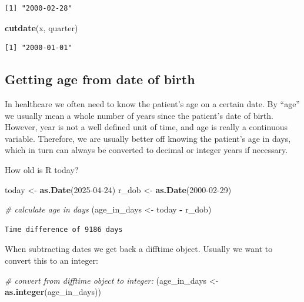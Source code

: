 \documentclass[
]{book}
\newenvironment{Shaded}{\begin{snugshade}}{\end{snugshade}}
\newcommand{\CommentTok}[1]{\textcolor[rgb]{0.56,0.35,0.01}{\textit{#1}}}
\newcommand{\FunctionTok}[1]{\textcolor[rgb]{0.13,0.29,0.53}{\textbf{#1}}}
\newcommand{\NormalTok}[1]{#1}
\newcommand{\OtherTok}[1]{\textcolor[rgb]{0.56,0.35,0.01}{#1}}
\newcommand{\SpecialCharTok}[1]{\textcolor[rgb]{0.81,0.36,0.00}{\textbf{#1}}}
\newcommand{\StringTok}[1]{\textcolor[rgb]{0.31,0.60,0.02}{#1}}
\begin{document}
\begin{verbatim}
[1] "2000-02-28"
\end{verbatim}

\begin{Shaded}
\begin{Highlighting}[]
\FunctionTok{cutdate}\NormalTok{(x, }\StringTok{\textquotesingle{}quarter\textquotesingle{}}\NormalTok{)}
\end{Highlighting}
\end{Shaded}

\begin{verbatim}
[1] "2000-01-01"
\end{verbatim}

\subsection{Getting age from date of birth}\label{getting-age-from-date-of-birth}

In healthcare we often need to know the patient's age on a certain date. By ``age'' we usually mean a whole number of years since the patient's date of birth. However, year is not a well defined unit of time, and age is really a continuous variable. Therefore, we are usually better off knowing the patient's age in days, which in turn can always be converted to decimal or integer years if necessary.

How old is R today?

\begin{Shaded}
\begin{Highlighting}[]
\NormalTok{today }\OtherTok{\textless{}{-}} \FunctionTok{as.Date}\NormalTok{(}\StringTok{\textquotesingle{}2025{-}04{-}24\textquotesingle{}}\NormalTok{)}
\NormalTok{r\_dob }\OtherTok{\textless{}{-}} \FunctionTok{as.Date}\NormalTok{(}\StringTok{\textquotesingle{}2000{-}02{-}29\textquotesingle{}}\NormalTok{)}

\CommentTok{\# calculate age in days}
\NormalTok{(age\_in\_days }\OtherTok{\textless{}{-}}\NormalTok{ today }\SpecialCharTok{{-}}\NormalTok{ r\_dob)}
\end{Highlighting}
\end{Shaded}

\begin{verbatim}
Time difference of 9186 days
\end{verbatim}

When subtracting dates we get back a difftime object. Usually we want to convert this to an integer:

\begin{Shaded}
\begin{Highlighting}[]
\CommentTok{\# convert from difftime object to integer:}
\NormalTok{(age\_in\_days }\OtherTok{\textless{}{-}} \FunctionTok{as.integer}\NormalTok{(age\_in\_days))}
\end{Highlighting}
\end{Shaded}
\end{document}
